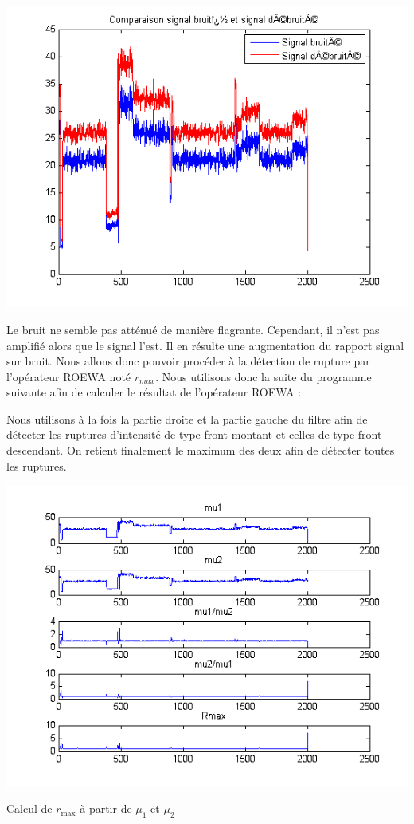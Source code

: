 \documentclass[a4paper,11pt]{article}
\newcommand{\FSource}[1]{%
  
  }
\begin{document}
\vspace{0.5cm}

\FSource{matlab/3-2.m}

\vspace{0.5cm}

\includegraphics[width=15cm]{capture3/partie3_04.png}

Le bruit ne semble pas atténué de manière flagrante. Cependant, il n'est pas
amplifié alors que le signal l'est. Il en résulte une augmentation du rapport
signal sur bruit.
Nous allons donc pouvoir procéder à la détection de rupture par l'opérateur ROEWA noté $r_{max}$. Nous utilisons donc la suite du programme suivante afin de calculer le résultat de l'opérateur ROEWA :

\vspace{0.5cm}

\FSource{matlab/3-3.m}

Nous utilisons à la fois la partie droite et la partie gauche du filtre afin de
détecter les ruptures d'intensité de type front montant et celles de type front
descendant. On retient finalement le maximum des deux afin de détecter toutes
les ruptures.

\includegraphics[width=15cm]{capture3/partie3_05.png}
\begin{center}Calcul de $r_\textrm{max}$ à partir de $\mu_1$ et
$\mu_2$\end{center}
\end{document}
